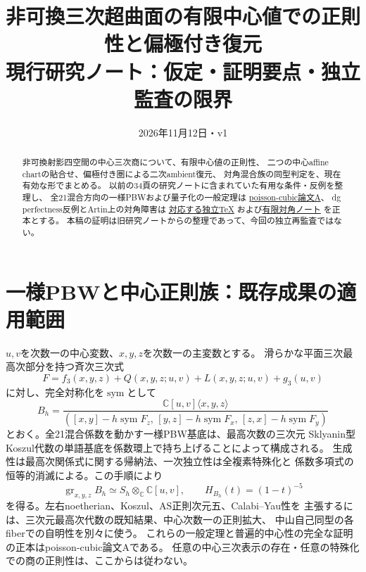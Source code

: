 \documentclass[11pt,a4paper]{ltjsarticle}
\title{非可換三次超曲面の有限中心値での正則性と偏極付き復元\\
\large 現行研究ノート：仮定・証明要点・独立監査の限界}
\date{2026年11月12日・v1}
\newcommand{\CC}{\mathbb C}
\newcommand{\gr}{\operatorname{gr}}
\newcommand{\AS}{\mathrm{AS}}
\begin{document}
\maketitle
\begin{abstract}
非可換射影四空間の中心三次商について、有限中心値の正則性、
二つの中心affine chartの貼合せ、偏極付き圏による二次ambient復元、
対角混合族の同型判定を、現在有効な形でまとめる。
以前の34頁の研究ノートに含まれていた有用な条件・反例を整理し、
全21混合方向の一様PBWおよび量子化の一般定理は
\href{https://github.com/uedakazushi/poisson-cubic/blob/main/papers/poisson-cubic.tex}{poisson-cubic論文A}、
dg perfectness反例とArtin上の対角障害は
\href{https://github.com/uedakazushi/nc-cubic2/blob/main/papers/relative_reconstruction/dg_perfectness_counterexamples.tex}{対応する独立TeX}
および\href{https://github.com/uedakazushi/nc-cubic2/blob/main/papers/relative_reconstruction/finite_bar_spreading.tex}{有限対角ノート}
を正本とする。
本稿の証明は旧研究ノートからの整理であって、今回の独立再監査ではない。
\end{abstract}

\section{一様PBWと中心正則族：既存成果の適用範囲}
$u,v$を次数一の中心変数、$x,y,z$を次数一の主変数とする。
滑らかな平面三次最高次部分を持つ斉次三次式
\[
 F=f_3(x,y,z)+Q(x,y,z;u,v)+L(x,y,z;u,v)+g_3(u,v)
\]
に対し、完全対称化を$\operatorname{sym}$として
\[
 B_h=\frac{\CC[u,v]\langle x,y,z\rangle}
 {([x,y]-h\operatorname{sym}F_z,\,
   [y,z]-h\operatorname{sym}F_x,\,
   [z,x]-h\operatorname{sym}F_y)}
\]
とおく。全21混合係数を動かす一様PBW基底は、最高次数の三次元
Sklyanin型Koszul代数の単語基底を係数環上で持ち上げることによって構成される。
生成性は最高次関係式に関する帰納法、一次独立性は全複素特殊化と
係数多項式の恒等的消滅による。この手順により
\[
 \gr_{x,y,z}B_h\simeq S_h\otimes_{\CC}\CC[u,v],
 \qquad H_{B_h}(t)=(1-t)^{-5}
\]
を得る。左右noetherian、Koszul、$\AS$正則次元五、Calabi--Yau性を
主張するには、三次元最高次代数の既知結果、中心次数一の正則拡大、
中山自己同型の各fiberでの自明性を別々に使う。
これらの一般定理と普遍的中心性の完全な証明の正本はpoisson-cubic論文Aである。
任意の中心三次表示の存在・任意の特殊化での商の正則性は、ここからは従わない。
\end{document}
